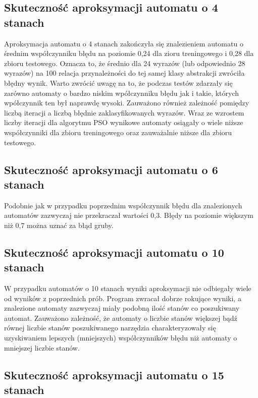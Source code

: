 \documentclass[runningheads,a4paper]{llncs}
\begin{document}
\FloatBarrier
\subsection{Skuteczność aproksymacji automatu o 4 stanach}

Aproksymacja automatu o 4 stanach zakończyła się znalezieniem automatu o średnim współczynniku błędu na poziomie 0,24 dla zioru treningowego i 0,28 dla zbioru testowego. Oznacza to, że średnio dla 24 wyrazów (lub odpowiednio 28 wyrazów) na 100 relacja przynależności do tej samej klasy abstrakcji zwróciła błędny wynik. Warto zwrócić uwagę na to, że podczas testów zdarzały się zarówno automaty o bardzo niskim wpółczynniku błędu jak i takie, których wpółczynnik ten był naprawdę wysoki. Zauważono również zależność pomiędzy liczbą iteracji a liczbą błędnie zaklasyfikowanych wyrazów. Wraz ze wzrostem liczby iteracji dla algorytmu PSO wynikowe automaty osiągały o wiele niższe współczynniki dla zbioru treningowego oraz zauważalnie niższe dla zbioru testowego. \\

\FloatBarrier
\subsection{Skuteczność aproksymacji automatu o 6 stanach}

Podobnie jak w przypadku poprzednim współczynnik błędu dla znalezionych automatów zazwyczaj nie przekraczał wartości 0,3. Błędy na poziomie większym niż 0,7 można uznać za błąd gruby. \\

\FloatBarrier
\subsection{Skuteczność aproksymacji automatu o 10 stanach}

W przypadku automatów o 10 stanach wyniki aproksymacji nie odbiegały wiele od wyników z poprzednich prób. Program zwracał dobrze rokujące wyniki, a znalezione automaty zazwyczaj miały podobną ilość stanów co poszukiwany automat. Zauważono zależność, że automaty o liczbie stanów większej bądź równej liczbie stanów poszukiwanego narzędzia charakteryzowały się uzyskiwaniem lepszych (mniejszych) współczynników błędu niż automaty o mniejszej liczbie stanów. \\

\FloatBarrier
\subsection{Skuteczność aproksymacji automatu o 15 stanach}
\end{document}
